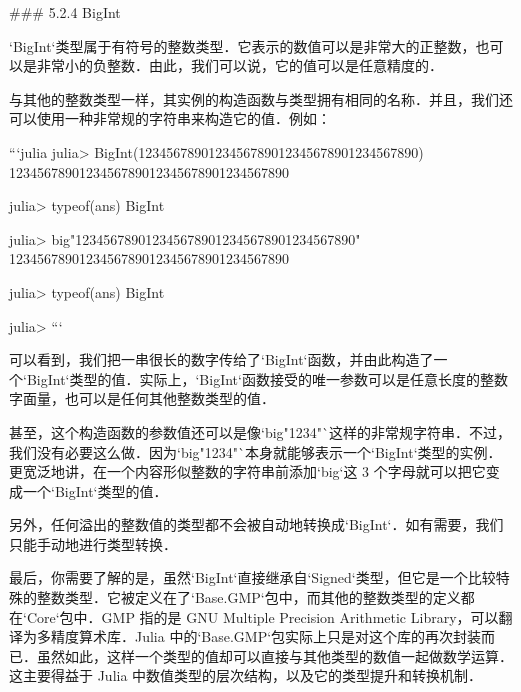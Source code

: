 ### 5.2.4 BigInt

`BigInt`类型属于有符号的整数类型．它表示的数值可以是非常大的正整数，也可以是非常小的负整数．由此，我们可以说，它的值可以是任意精度的．

与其他的整数类型一样，其实例的构造函数与类型拥有相同的名称．并且，我们还可以使用一种非常规的字符串来构造它的值．例如：

```julia
julia> BigInt(1234567890123456789012345678901234567890)
1234567890123456789012345678901234567890

julia> typeof(ans)
BigInt

julia> big"1234567890123456789012345678901234567890"
1234567890123456789012345678901234567890

julia> typeof(ans)
BigInt

julia>
```

可以看到，我们把一串很长的数字传给了`BigInt`函数，并由此构造了一个`BigInt`类型的值．实际上，`BigInt`函数接受的唯一参数可以是任意长度的整数字面量，也可以是任何其他整数类型的值．

甚至，这个构造函数的参数值还可以是像`big"1234"`这样的非常规字符串．不过，我们没有必要这么做．因为`big"1234"`本身就能够表示一个`BigInt`类型的实例．更宽泛地讲，在一个内容形似整数的字符串前添加`big`这 3 个字母就可以把它变成一个`BigInt`类型的值．

另外，任何溢出的整数值的类型都不会被自动地转换成`BigInt`．如有需要，我们只能手动地进行类型转换．

最后，你需要了解的是，虽然`BigInt`直接继承自`Signed`类型，但它是一个比较特殊的整数类型．它被定义在了`Base.GMP`包中，而其他的整数类型的定义都在`Core`包中．GMP 指的是 GNU Multiple Precision Arithmetic Library，可以翻译为多精度算术库．Julia 中的`Base.GMP`包实际上只是对这个库的再次封装而已．虽然如此，这样一个类型的值却可以直接与其他类型的数值一起做数学运算．这主要得益于 Julia 中数值类型的层次结构，以及它的类型提升和转换机制．